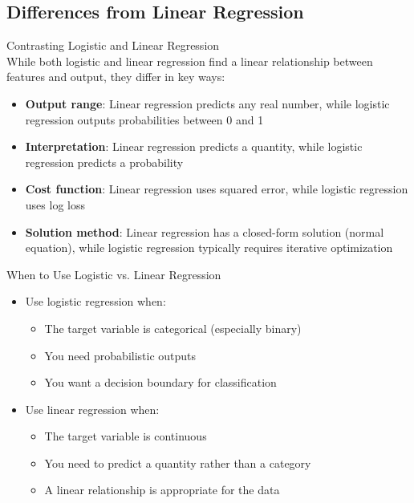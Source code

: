 \subsection{Differences from Linear Regression}

\begin{concept}{Contrasting Logistic and Linear Regression}\\
While both logistic and linear regression find a linear relationship between features and output, they differ in key ways:
\begin{itemize}
    \item \textbf{Output range}: Linear regression predicts any real number, while logistic regression outputs probabilities between 0 and 1
    \item \textbf{Interpretation}: Linear regression predicts a quantity, while logistic regression predicts a probability
    \item \textbf{Cost function}: Linear regression uses squared error, while logistic regression uses log loss
    \item \textbf{Solution method}: Linear regression has a closed-form solution (normal equation), while logistic regression typically requires iterative optimization
\end{itemize}
\end{concept}

\begin{concept}{When to Use Logistic vs. Linear Regression}\\
\begin{itemize}
    \item Use logistic regression when:
    \begin{itemize}
        \item The target variable is categorical (especially binary)
        \item You need probabilistic outputs
        \item You want a decision boundary for classification
    \end{itemize}
    \item Use linear regression when:
    \begin{itemize}
        \item The target variable is continuous
        \item You need to predict a quantity rather than a category
        \item A linear relationship is appropriate for the data
    \end{itemize}
\end{itemize}
\end{concept}

